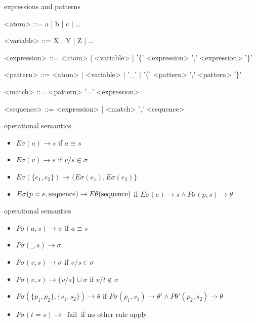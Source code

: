 \begin{frame}{expressions and patterns}

\begin{grammar}
<atom> ::= a | b | c | \ldots

<variable> ::= X | Y | Z | \ldots

<expression> ::= <atom> | <variable> | '\{' <expression> ',' <expression> '\}'

<pattern> ::= <atom> | <variable> | '\_' | '\{' <pattern> ',' <pattern> '\}'

<match> ::=  <pattern> '=' <expression>

<sequence> ::=  <expression> | <match> ',' <sequence>
\end{grammar}
\end{frame}

\begin{frame}{operational semantics}

 \begin{itemize}
   \pause \item $E\sigma(a) \rightarrow s$ if $a \equiv s$ 
   \pause \item $E\sigma(v) \rightarrow s$ if $v/s \in \sigma$
   \pause \item $E\sigma(\lbrace e_1 , e_2\rbrace) \rightarrow \lbrace E\sigma(e_1), E\sigma(e_2) \rbrace$
 \end{itemize}

\begin{itemize}
  \pause \item $E\sigma(p = e, {\rm sequence}) \rightarrow E\theta({\rm sequence})$ if  $E\sigma(e) \rightarrow s \wedge P\sigma(p, s) \rightarrow \theta$
\end{itemize}

\end{frame}

\begin{frame}{operational semantics}

\pause
\begin{itemize}
  \pause \item $P\sigma(a, s) \rightarrow \sigma$  if  $a \equiv s$
  \pause \item $P\sigma(\_, s) \rightarrow \sigma$  
  \pause \item $P\sigma(v, s) \rightarrow \sigma$  if \pause $ v/s \in \sigma $
  \pause \item $P\sigma(v, s) \rightarrow \lbrace v/s \rbrace \cup \sigma$ if \pause $ v/t \not\in \sigma$
  \pause \item $P\sigma(\lbrace p_1, p_2 \rbrace , \lbrace s_1, s_2 \rbrace) \rightarrow \theta$ if
      $P\sigma(p_1 , s_1) \rightarrow \theta' \wedge P\theta'(p_2 , s_2) \rightarrow \theta$
\end{itemize}
\pause
\begin{itemize}
  \pause \item $P\sigma(t = s) \rightarrow$ \pause $\  \mathrm{fail}\ $ if no other rule apply
\end{itemize}

\end{frame}


